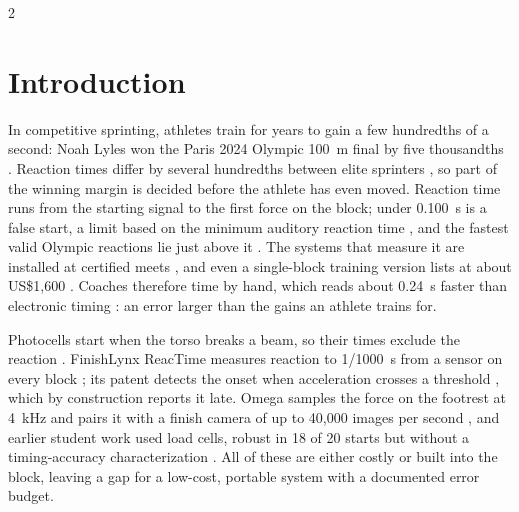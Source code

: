 \documentclass[9pt,a4paper]{extarticle}
\begin{document}
\ELRMakeTitle

\begin{multicols}{2}
\raggedcolumns
{}
\titleformat{\section}{\sffamily\fontsize{12}{14}\selectfont\bfseries\color{ELRBlue}}{\ELRAccentText{\thesection}}{0.6em}{}
\titlespacing*{\section}{0pt}{0.8em}{0.3em}

\section{Introduction}

In competitive sprinting, athletes train for years to gain a few hundredths of a second: Noah Lyles won the Paris 2024 Olympic 100~m final by five thousandths \cite{olymp}. Reaction times differ by several hundredths between elite sprinters \cite{lipps}, so part of the winning margin is decided before the athlete has even moved. Reaction time runs from the starting signal to the first force on the block; under 0.100~s is a false start, a limit based on the minimum auditory reaction time \cite{pain}, and the fastest valid Olympic reactions lie just above it \cite{lipps,brosnan}. The systems that measure it are installed at certified meets \cite{lynx}, and even a single-block training version lists at about US\$1{,}600 \cite{vsath}. Coaches therefore time by hand, which reads about 0.24~s faster than electronic timing \cite{mann}: an error larger than the gains an athlete trains for.

Photocells start when the torso breaks a beam, so their times exclude the reaction \cite{haugen}. FinishLynx ReacTime measures reaction to 1/1000~s from a sensor on every block \cite{lynx}; its patent detects the onset when acceleration crosses a threshold \cite{lynxpatent}, which by construction reports it late. Omega samples the force on the footrest at 4~kHz and pairs it with a finish camera of up to 40{,}000 images per second \cite{omega}, and earlier student work used load cells, robust in 18 of 20 starts but without a timing-accuracy characterization \cite{heim}. All of these are either costly or built into the block, leaving a gap for a low-cost, portable system with a documented error budget.


\end{multicols}
\end{document}

